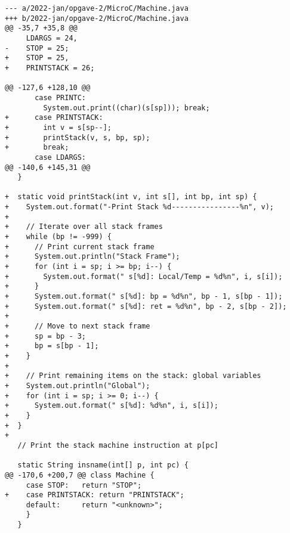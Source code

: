 \begin{verbatim}
--- a/2022-jan/opgave-2/MicroC/Machine.java
+++ b/2022-jan/opgave-2/MicroC/Machine.java
@@ -35,7 +35,8 @@ 
     LDARGS = 24,
-    STOP = 25;
+    STOP = 25,
+    PRINTSTACK = 26;
 
@@ -127,6 +128,10 @@
       case PRINTC:
         System.out.print((char)(s[sp])); break; 
+      case PRINTSTACK:
+        int v = s[sp--];
+        printStack(v, s, bp, sp);
+        break;
       case LDARGS:
@@ -140,6 +145,31 @@
   }
 
+  static void printStack(int v, int s[], int bp, int sp) {
+    System.out.format("-Print Stack %d----------------%n", v);
+
+    // Iterate over all stack frames
+    while (bp != -999) {
+      // Print current stack frame
+      System.out.println("Stack Frame");
+      for (int i = sp; i >= bp; i--) {
+        System.out.format(" s[%d]: Local/Temp = %d%n", i, s[i]);
+      }
+      System.out.format(" s[%d]: bp = %d%n", bp - 1, s[bp - 1]);
+      System.out.format(" s[%d]: ret = %d%n", bp - 2, s[bp - 2]);
+
+      // Move to next stack frame
+      sp = bp - 3;
+      bp = s[bp - 1];
+    }
+
+    // Print remaining items on the stack: global variables
+    System.out.println("Global");
+    for (int i = sp; i >= 0; i--) {
+      System.out.format(" s[%d]: %d%n", i, s[i]);
+    }
+  }
+
   // Print the stack machine instruction at p[pc]
 
   static String insname(int[] p, int pc) {
@@ -170,6 +200,7 @@ class Machine {
     case STOP:   return "STOP";
+    case PRINTSTACK: return "PRINTSTACK";
     default:     return "<unknown>";
     }
   }
\end{verbatim}

